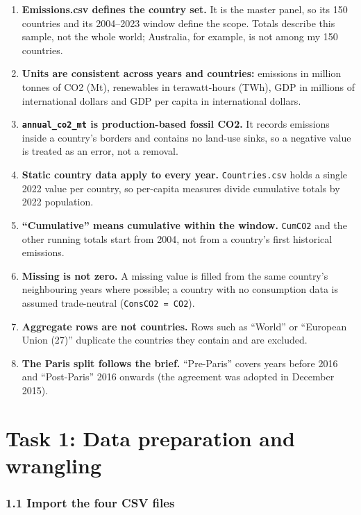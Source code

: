 \documentclass[
]{article}
\providecommand{\tightlist}{%
  \setlength{\itemsep}{0pt}\setlength{\parskip}{0pt}}
\begin{document}
\begin{enumerate}
\def\labelenumi{\arabic{enumi}.}
\tightlist
\item
  \textbf{Emissions.csv defines the country set.} It is the master
  panel, so its 150 countries and its 2004--2023 window define the
  scope. Totals describe this sample, not the whole world; Australia,
  for example, is not among my 150 countries.
\item
  \textbf{Units are consistent across years and countries:} emissions in
  million tonnes of CO2 (Mt), renewables in terawatt-hours (TWh), GDP in
  millions of international dollars and GDP per capita in international
  dollars.
\item
  \textbf{\texttt{annual\_co2\_mt} is production-based fossil CO2.} It
  records emissions inside a country's borders and contains no land-use
  sinks, so a negative value is treated as an error, not a removal.
\item
  \textbf{Static country data apply to every year.}
  \texttt{Countries.csv} holds a single 2022 value per country, so
  per-capita measures divide cumulative totals by 2022 population.
\item
  \textbf{``Cumulative'' means cumulative within the window.}
  \texttt{CumCO2} and the other running totals start from 2004, not from
  a country's first historical emissions.
\item
  \textbf{Missing is not zero.} A missing value is filled from the same
  country's neighbouring years where possible; a country with no
  consumption data is assumed trade-neutral (\texttt{ConsCO2\ =\ CO2}).
\item
  \textbf{Aggregate rows are not countries.} Rows such as ``World'' or
  ``European Union (27)'' duplicate the countries they contain and are
  excluded.
\item
  \textbf{The Paris split follows the brief.} ``Pre-Paris'' covers years
  before 2016 and ``Post-Paris'' 2016 onwards (the agreement was adopted
  in December 2015).
\end{enumerate}

\newpage

\section{Task 1: Data preparation and
wrangling}\label{task-1-data-preparation-and-wrangling}

\subsubsection{1.1 Import the four CSV
files}\label{import-the-four-csv-files}
\end{document}
